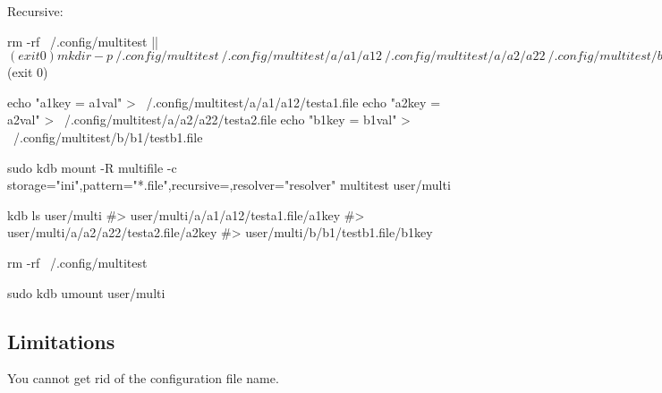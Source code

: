 Recursive\+:


\begin{DoxyCode}
rm -rf ~/.config/multitest || $(exit 0)
mkdir -p ~/.config/multitest ~/.config/multitest/a/a1/a12 ~/.config/multitest/a/a2/a22
       ~/.config/multitest/b/b1|| $(exit 0)

echo "a1key = a1val" > ~/.config/multitest/a/a1/a12/testa1.file
echo "a2key = a2val" > ~/.config/multitest/a/a2/a22/testa2.file
echo "b1key = b1val" > ~/.config/multitest/b/b1/testb1.file

sudo kdb mount -R multifile -c storage="ini",pattern="*.file",recursive=,resolver="resolver" multitest
       user/multi

kdb ls user/multi
#> user/multi/a/a1/a12/testa1.file/a1key
#> user/multi/a/a2/a22/testa2.file/a2key
#> user/multi/b/b1/testb1.file/b1key

rm -rf ~/.config/multitest

sudo kdb umount user/multi
\end{DoxyCode}


\subsection*{Limitations}


\begin{DoxyItemize}
\item You cannot get rid of the configuration file name. 
\end{DoxyItemize}
